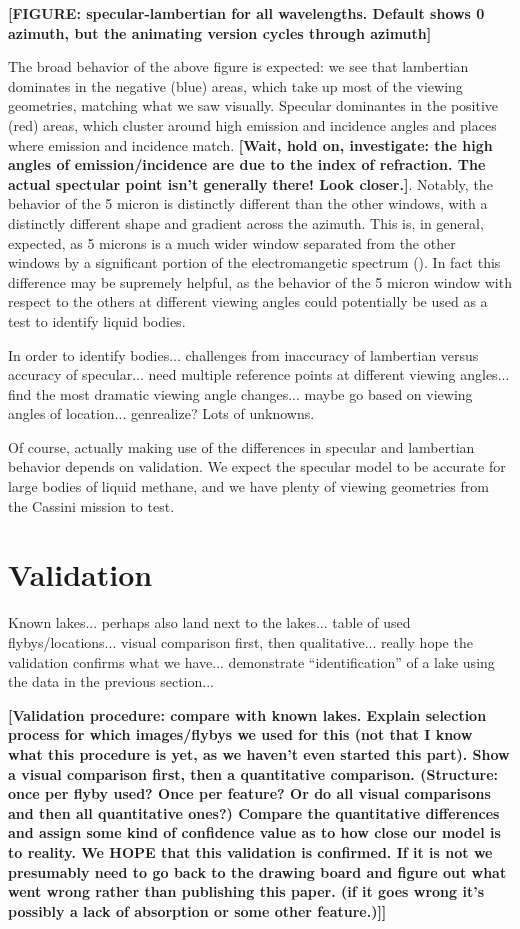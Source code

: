 \documentclass{article}
\begin{document}
\textbf{\color{red} [FIGURE: specular-lambertian for all wavelengths. Default shows 0 azimuth, but the animating version cycles through azimuth] \color{black}}

The broad behavior of the above figure is expected: we see that lambertian dominates in the negative (blue) areas, which take up most of the viewing geometries, matching what we saw visually. Specular dominantes in the positive (red) areas, which cluster around high emission and incidence angles and places where emission and incidence match. \textbf{\color{red}[Wait, hold on, investigate: the high angles of emission/incidence are due to the index of refraction. The actual spectular point isn't generally there! Look closer.]\color{black}}. Notably, the behavior of the 5 micron is distinctly different than the other windows, with a distinctly different shape and gradient across the azimuth. This is, in general, expected, as 5 microns is a much wider window separated from the other windows by a significant portion of the electromangetic spectrum (). In fact this difference may be supremely helpful, as the behavior of the 5 micron window with respect to the others at different viewing angles could potentially be used as a test to identify liquid bodies. 

\color{Green}In order to identify bodies... challenges from inaccuracy of lambertian versus accuracy of specular... need multiple reference points at different viewing angles... find the most dramatic viewing angle changes... maybe go based on viewing angles of location... genrealize? Lots of unknowns. \color{black}

Of course, actually making use of the differences in specular and lambertian behavior depends on validation. We expect the specular model to be accurate for large bodies of liquid methane, and we have plenty of viewing geometries from the Cassini mission to test.

\section{Validation}
\color{Green}Known lakes... perhaps also land next to the lakes... table of used flybys/locations... visual comparison first, then qualitative... really hope the validation confirms what we have... demonstrate ``identification'' of a lake using the data in the previous section... \color{black}

\textbf{\color{red}[Validation procedure: compare with known lakes. Explain selection process for which images/flybys we used for this (not that I know what this procedure is yet, as we haven't even started this part). Show a visual comparison first, then a quantitative comparison. (Structure: once per flyby used? Once per feature? Or do all visual comparisons and then all quantitative ones?) Compare the quantitative differences and assign some kind of confidence value as to how close our model is to reality. We HOPE that this validation is confirmed. If it is not we presumably need to go back to the drawing board and figure out what went wrong rather than publishing this paper. (if it goes wrong it's possibly a lack of absorption or some other feature.)]]\color{black}}
\end{document}
